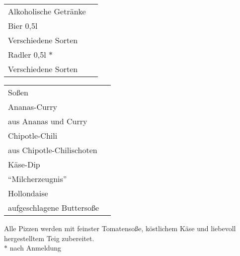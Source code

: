 \documentclass[12pt]{article}
\makeatletter
\newcommand*\ColText[1]{\textcolor{Goldenrod3}{#1}}
\newenvironment{Group}[1]
  {\noindent\begin{tabular*}{\textwidth}{@{}p{\linewidth}@{\extracolsep{\fill}}r@{}}
    {\fontsize{24}{29}\selectfont\ColText{#1}}\\[0.8em]}
  {\end{tabular*}}
\newcommand*\Entry[2]{%
  \sffamily#1 & #2}
\newcommand*\Expl[1]{%
  \hspace*{1em}\footnotesize #1\vspace*{5pt}}
\newcommand*\Footer[0]{%
\vfill
\noindent \small Alle Pizzen werden mit feinster Tomatensoße, köstlichem Käse und liebe\-voll hergestelltem  Teig zubereitet.\\
$\ast$ nach Anmeldung}
\makeatother
\begin{document}
\vspace{3em}

\begin{Group}{Alkoholische Getränke}
\Entry{Bier 0,5l}{} \\
\Expl{Verschiedene Sorten} \\
\Entry{Radler 0,5l $\ast$}{} \\
\Expl{Verschiedene Sorten} \\
\end{Group}

\vspace{3em}

\begin{Group}{Soßen}
	\Entry{Ananas-Curry}{} \\
	\Expl{aus Ananas und Curry} \\
	\Entry{Chipotle-Chili}{} \\
	\Expl{aus Chipotle-Chilischoten} \\
	\Entry{Käse-Dip} \\
	\Expl{``Milcherzeugnis''} \\
	\Entry{Hollondaise} \\
	\Expl{aufgeschlagene Buttersoße} \\
\end{Group}

\Footer
\end{document}
